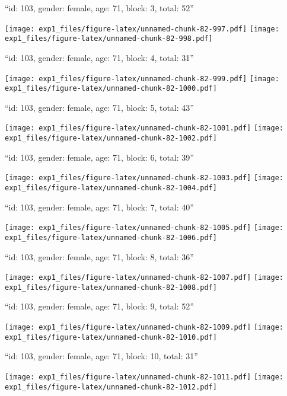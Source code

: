 \documentclass[11pt,,]{article}
\begin{document}
\newpage
[1] 

``id: 103, gender: female, age: 71, block: 3, total: 52''

\texttt{[image: exp1\_files/figure-latex/unnamed-chunk-82-997.pdf]}
\texttt{[image: exp1\_files/figure-latex/unnamed-chunk-82-998.pdf]}

\newpage
[1] 

``id: 103, gender: female, age: 71, block: 4, total: 31''

\texttt{[image: exp1\_files/figure-latex/unnamed-chunk-82-999.pdf]}
\texttt{[image: exp1\_files/figure-latex/unnamed-chunk-82-1000.pdf]}

\newpage
[1] 

``id: 103, gender: female, age: 71, block: 5, total: 43''

\texttt{[image: exp1\_files/figure-latex/unnamed-chunk-82-1001.pdf]}
\texttt{[image: exp1\_files/figure-latex/unnamed-chunk-82-1002.pdf]}

\newpage
[1] 

``id: 103, gender: female, age: 71, block: 6, total: 39''

\texttt{[image: exp1\_files/figure-latex/unnamed-chunk-82-1003.pdf]}
\texttt{[image: exp1\_files/figure-latex/unnamed-chunk-82-1004.pdf]}

\newpage
[1] 

``id: 103, gender: female, age: 71, block: 7, total: 40''

\texttt{[image: exp1\_files/figure-latex/unnamed-chunk-82-1005.pdf]}
\texttt{[image: exp1\_files/figure-latex/unnamed-chunk-82-1006.pdf]}

\newpage
[1] 

``id: 103, gender: female, age: 71, block: 8, total: 36''

\texttt{[image: exp1\_files/figure-latex/unnamed-chunk-82-1007.pdf]}
\texttt{[image: exp1\_files/figure-latex/unnamed-chunk-82-1008.pdf]}

\newpage
[1] 

``id: 103, gender: female, age: 71, block: 9, total: 52''

\texttt{[image: exp1\_files/figure-latex/unnamed-chunk-82-1009.pdf]}
\texttt{[image: exp1\_files/figure-latex/unnamed-chunk-82-1010.pdf]}

\newpage
[1] 

``id: 103, gender: female, age: 71, block: 10, total: 31''

\texttt{[image: exp1\_files/figure-latex/unnamed-chunk-82-1011.pdf]}
\texttt{[image: exp1\_files/figure-latex/unnamed-chunk-82-1012.pdf]}
\end{document}
